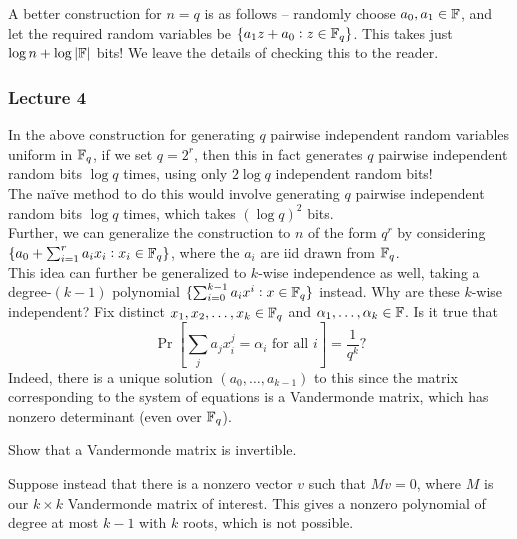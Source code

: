 			A better construction for $n = q$ is as follows -- randomly choose $a_0,a_1 \in \mathbb{F}$, and let the required random variables be $\{ a_1z+a_0 : z \in \mathbb{F}_q \}$. This takes just $\log n + \log |\mathbb{F}|$ bits! We leave the details of checking this to the reader.\\

		
		\subsubsection{Lecture 4}


			In the above construction for generating $q$ pairwise independent random variables uniform in $\mathbb{F}_q$, if we set $q = 2^r$, then this in fact generates $q$ pairwise independent random bits $\log q$ times, using only $2 \log q$ independent random bits!\\
			The na\"{i}ve method to do this would involve generating $q$ pairwise independent random bits $\log q$ times, which takes $(\log q)^2$ bits.\\

			Further, we can generalize the construction to $n$ of the form $q^r$ by considering $\{ a_0 + \sum_{i=1}^r a_i x_i : x_i \in \mathbb{F}_q \}$, where the $a_i$ are iid drawn from $\mathbb{F}_q$.\\
			This idea can further be generalized to $k$-wise independence as well, taking a degree-$(k-1)$ polynomial $\{ \sum_{i=0}^{k-1} a_i x^i : x \in \mathbb{F}_q \}$ instead. Why are these $k$-wise independent? Fix distinct $x_1,x_2,\ldots,x_k \in \mathbb{F}_q$ and $\alpha_1,\ldots,\alpha_k \in \mathbb{F}$. Is it true that
			\[ \Pr[\sum_{j} a_j x_i^j = \alpha_i \text{ for all $i$}] = \frac{1}{q^k}? \]
			Indeed, there is a unique solution $(a_0,\ldots,a_{k-1})$ to this since the matrix corresponding to the system of equations is a Vandermonde matrix, which has nonzero determinant (even over $\mathbb{F}_q$).

			\begin{exercise}
				Show that a Vandermonde matrix is invertible.
			\end{exercise}
			\begin{solution*}
				Suppose instead that there is a nonzero vector $v$ such that $Mv = 0$, where $M$ is our $k\times k$ Vandermonde matrix of interest. This gives a nonzero polynomial of degree at most $k-1$ with $k$ roots, which is not possible.
			\end{solution*}

